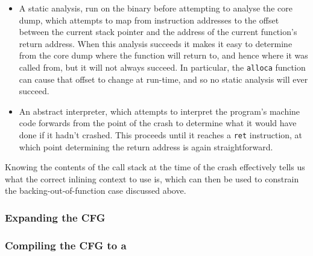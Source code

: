\begin{itemize}
\item
  A static analysis, run on the binary before attempting to analyse
  the core dump, which attempts to map from instruction addresses to
  the offset between the current stack pointer and the address of the
  current function's return address.  When this analysis succeeds it
  makes it easy to determine from the core dump where the function
  will return to, and hence where it was called from, but it will not
  always succeed.  In particular, the \verb|alloca| function can cause
  that offset to change at run-time, and so no static analysis will
  ever succeed.
\item
  An abstract interpreter, which attempts to interpret the program's
  machine code forwards from the point of the crash to determine what
  it would have done if it hadn't crashed.  This proceeds until it
  reaches a \verb|ret| instruction, at which point determining the
  return address is again straightforward.
\end{itemize}


Knowing the contents of the call stack at the time of the crash
effectively tells us what the correct inlining context to use is,
which can then be used to constrain the backing-out-of-function case
discussed above.

\subsubsection{Expanding the CFG}
\label{sect:derive:benefits_of_longer_fragments}


\subsubsection{Compiling the CFG to a \StateMachine}
\label{sect:derive:compile_cfg}


